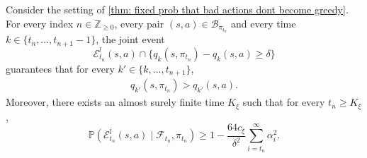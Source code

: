 \begin{lemma}
\label{thm: event noise remains small}
Consider the setting of \autoref{thm: fixed prob that bad actions dont become greedy}.
For every index $n \in \mathbb Z_{\ge 0}$,
every pair $(s,a) \in \mathcal B_{\pi_{t_n}}$
and every time $k \in \{t_n, \dots, t_{n+1}-1\}$,
the joint event
\[
\mathcal E^l_{t_n}(s,a) \cap \big\{ q_{k}(s,\pi_{t_n}) - q_{k}(s,a) \ge \delta \big\}
\]
guarantees that
for every $k' \in \{k, \dots, t_{n+1}\}$,
\begin{align}
\label{eq: gap remains strictly positive}
q_{k'}(s,\pi_{t_n}) > q_{k'}(s,a) .
\end{align}
Moreover, there exists an almost surely finite time $K_\xi$ such that for every $t_n \ge K_\xi$,
\begin{equation}
\label{eq:probability-small-remaining-noise}
\mathbb P\!\left(\mathcal E^l_{t_n}(s,a)\mid \mathcal F_{t_n}, \pi_{t_n} \right)
\ge
1-\frac{64 c_\xi}{\delta^2}\sum_{i=t_n}^\infty \alpha_i^2 .
\end{equation}
\end{lemma}
\vspace{-0.6cm}
